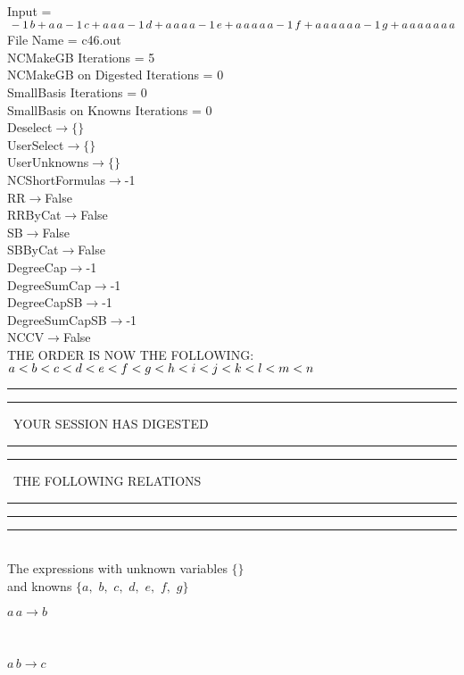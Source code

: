 \documentclass[rep10,leqno]{report}
\begin{document}
\normalsize
\baselineskip=12pt
\noindent
Input = 
$
\\-1\,
 b + a\,
 a\\
-1\,
 c + a\,
 a\,
 a\\
-1\,
 d + a\,
 a\,
 a\,
 a\\
-1\,
 e + a\,
 a\,
 a\,
 a\,
 a\\
-1\,
 f + a\,
 a\,
 a\,
 a\,
 a\,
 a\\
-1\,
 g + a\,
 a\,
 a\,
 a\,
 a\,
 a\,
 a\\
$
File Name = c46.out\\
NCMakeGB Iterations = 5\\
NCMakeGB on Digested Iterations = 0\\
SmallBasis Iterations = 0\\
SmallBasis on Knowns Iterations = 0\\
Deselect$\rightarrow \{\}$\\
UserSelect$\rightarrow \{\}$\\
UserUnknowns$\rightarrow \{\}$\\
NCShortFormulas$\rightarrow$-1\\
RR$\rightarrow $False\\
RRByCat$\rightarrow $False\\
SB$\rightarrow $False\\
SBByCat$\rightarrow $False\\
DegreeCap$\rightarrow $-1\\
DegreeSumCap$\rightarrow $-1\\
DegreeCapSB$\rightarrow $-1\\
DegreeSumCapSB$\rightarrow $-1\\
NCCV$\rightarrow $False\\
THE ORDER IS NOW THE FOLLOWING:\hfil\break
$
a<b<c<d<e<f<g<h<i<j<k<l<m<n\\
$
\rule[2pt]{6in}{4pt}\hfil\break
\rule[2pt]{1.879in}{4pt}
\ YOUR SESSION HAS DIGESTED\ 
\rule[2pt]{1.879in}{4pt}\hfil\break
\rule[2pt]{1.923in}{4pt}
\ THE FOLLOWING RELATIONS\ 
\rule[2pt]{1.923in}{4pt}\hfil\break
\rule[2pt]{6in}{4pt}\hfil\break
\rule[3pt]{6in}{.7pt}\\
The expressions with unknown variables $\{\}$\\
and knowns $\{a,
$ $
b,
$ $
c,
$ $
d,
$ $
e,
$ $
f,
$ $
g\}$\smallskip\\
\begin{minipage}{6in}
$
a\,
 a\rightarrow b
$
\end{minipage}\medskip \\
\begin{minipage}{6in}
$
a\,
 b\rightarrow c
$
\end{minipage}\medskip \\
\end{document}
